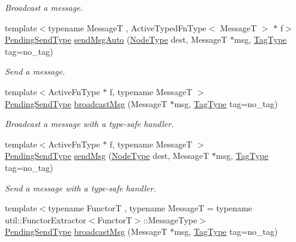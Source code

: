\begin{DoxyCompactItemize}
\begin{DoxyCompactList}\small\item\em Broadcast a message. \end{DoxyCompactList}\item 
{\footnotesize template$<$typename MessageT , Active\+Typed\+Fn\+Type$<$ Message\+T $>$ $\ast$ f$>$ }\\\hyperlink{structvt_1_1messaging_1_1_active_messenger_a3626a6ca76d8ad4ec7c3b47a2c70d3a8}{Pending\+Send\+Type} \hyperlink{group__typesafehan_gaa14d019beb87eda73c7bcb1e15823f61}{send\+Msg\+Auto} (\hyperlink{namespacevt_a866da9d0efc19c0a1ce79e9e492f47e2}{Node\+Type} dest, MessageT $\ast$msg, \hyperlink{namespacevt_a84ab281dae04a52a4b243d6bf62d0e52}{Tag\+Type} tag=no\+\_\+tag)
\begin{DoxyCompactList}\small\item\em Send a message. \end{DoxyCompactList}\item 
{\footnotesize template$<$Active\+Fn\+Type $\ast$ f, typename MessageT $>$ }\\\hyperlink{structvt_1_1messaging_1_1_active_messenger_a3626a6ca76d8ad4ec7c3b47a2c70d3a8}{Pending\+Send\+Type} \hyperlink{group__basicsend_gaadd12687ecb3f0e9be2ce62224568d77}{broadcast\+Msg} (MessageT $\ast$msg, \hyperlink{namespacevt_a84ab281dae04a52a4b243d6bf62d0e52}{Tag\+Type} tag=no\+\_\+tag)
\begin{DoxyCompactList}\small\item\em Broadcast a message with a type-\/safe handler. \end{DoxyCompactList}\item 
{\footnotesize template$<$Active\+Fn\+Type $\ast$ f, typename MessageT $>$ }\\\hyperlink{structvt_1_1messaging_1_1_active_messenger_a3626a6ca76d8ad4ec7c3b47a2c70d3a8}{Pending\+Send\+Type} \hyperlink{group__basicsend_ga9a7d3d70ca04c51781771661fa5d3795}{send\+Msg} (\hyperlink{namespacevt_a866da9d0efc19c0a1ce79e9e492f47e2}{Node\+Type} dest, MessageT $\ast$msg, \hyperlink{namespacevt_a84ab281dae04a52a4b243d6bf62d0e52}{Tag\+Type} tag=no\+\_\+tag)
\begin{DoxyCompactList}\small\item\em Send a message with a type-\/safe handler. \end{DoxyCompactList}\item 
{\footnotesize template$<$typename FunctorT , typename MessageT  = typename util\+::\+Functor\+Extractor$<$\+Functor\+T$>$\+::\+Message\+Type$>$ }\\\hyperlink{structvt_1_1messaging_1_1_active_messenger_a3626a6ca76d8ad4ec7c3b47a2c70d3a8}{Pending\+Send\+Type} \hyperlink{group__functorsend_gaadd12687ecb3f0e9be2ce62224568d77}{broadcast\+Msg} (MessageT $\ast$msg, \hyperlink{namespacevt_a84ab281dae04a52a4b243d6bf62d0e52}{Tag\+Type} tag=no\+\_\+tag)

\end{DoxyCompactItemize}
